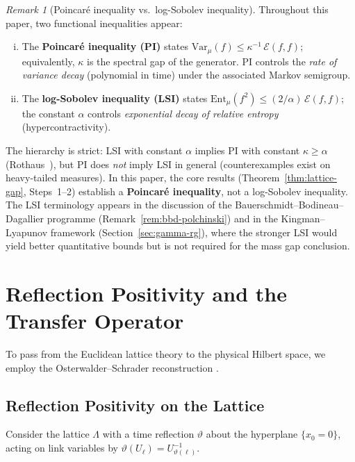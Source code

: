 \documentclass[12pt,a4paper]{article}
\theoremstyle{definition}
\theoremstyle{plain}
\theoremstyle{remark}
\newtheorem{remark}[definition]{Remark}
\begin{document}
\begin{remark}[Poincar\'e inequality vs.\ log-Sobolev inequality]\label{rem:pi-vs-lsi}
Throughout this paper, two functional inequalities appear:
\begin{enumerate}[(i)]
\item The \textbf{Poincar\'e inequality (PI)} states $\mathrm{Var}_\mu(f) \leq \kappa^{-1}\,\mathcal{E}(f,f)$; equivalently, $\kappa$ is the spectral gap of the generator. PI controls the \emph{rate of variance decay} (polynomial in time) under the associated Markov semigroup.
\item The \textbf{log-Sobolev inequality (LSI)} states $\mathrm{Ent}_\mu(f^2) \leq (2/\alpha)\,\mathcal{E}(f,f)$; the constant $\alpha$ controls \emph{exponential decay of relative entropy} (hypercontractivity).
\end{enumerate}
The hierarchy is strict: LSI with constant $\alpha$ implies PI with constant $\kappa \geq \alpha$ (Rothaus~\cite{Rothaus1985}), but PI does \emph{not} imply LSI in general (counterexamples exist on heavy-tailed measures). In this paper, the core results (Theorem~\ref{thm:lattice-gap}, Steps~1--2) establish a \textbf{Poincar\'e inequality}, not a log-Sobolev inequality. The LSI terminology appears in the discussion of the Bauerschmidt--Bodineau--Dagallier programme (Remark~\ref{rem:bbd-polchinski}) and in the Kingman--Lyapunov framework (Section~\ref{sec:gamma-rg}), where the stronger LSI would yield better quantitative bounds but is not required for the mass gap conclusion.
\end{remark}

\section{Reflection Positivity and the Transfer Operator}

To pass from the Euclidean lattice theory to the physical Hilbert space, we employ the Osterwalder--Schrader reconstruction \cite{OsterwalderSchrader1973, OsterwalderSchrader1975}.

\subsection{Reflection Positivity on the Lattice}

Consider the lattice $\Lambda$ with a time reflection $\vartheta$ about the hyperplane $\{x_0 = 0\}$, acting on link variables by $\vartheta(U_\ell) = U_{\vartheta(\ell)}^{-1}$.
\end{document}
